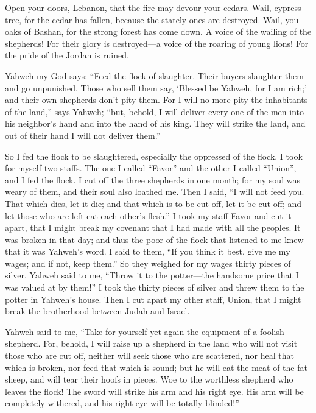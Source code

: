  Open your doors, Lebanon, that the fire may devour your
cedars.  Wail, cypress tree, for the cedar has fallen,
because the stately ones are destroyed. Wail, you oaks of Bashan, for
the strong forest has come down.  A voice of the wailing
of the shepherds! For their glory is destroyed---a voice of the roaring
of young lions! For the pride of the Jordan is ruined.

 Yahweh my God says: ``Feed the flock of slaughter.
 Their buyers slaughter them and go unpunished. Those who
sell them say, `Blessed be Yahweh, for I am rich;' and their own
shepherds don't pity them.  For I will no more pity the
inhabitants of the land,'' says Yahweh; ``but, behold, I will deliver
every one of the men into his neighbor's hand and into the hand of his
king. They will strike the land, and out of their hand I will not
deliver them.''

 So I fed the flock to be slaughtered, especially the
oppressed of the flock. I took for myself two staffs. The one I called
``Favor'' and the other I called ``Union'', and I fed the flock.
 I cut off the three shepherds in one month; for my soul
was weary of them, and their soul also loathed me.  Then I
said, ``I will not feed you. That which dies, let it die; and that which
is to be cut off, let it be cut off; and let those who are left eat each
other's flesh.''  I took my staff Favor and cut it apart,
that I might break my covenant that I had made with all the peoples.
 It was broken in that day; and thus the poor of the
flock that listened to me knew that it was Yahweh's word.
 I said to them, ``If you think it best, give me my
wages; and if not, keep them.'' So they weighed for my wages thirty
pieces of silver.  Yahweh said to me, ``Throw it to the
potter---the handsome price that I was valued at by them!'' I took the
thirty pieces of silver and threw them to the potter in Yahweh's house.
 Then I cut apart my other staff, Union, that I might
break the brotherhood between Judah and Israel.

 Yahweh said to me, ``Take for yourself yet again the
equipment of a foolish shepherd.  For, behold, I will
raise up a shepherd in the land who will not visit those who are cut
off, neither will seek those who are scattered, nor heal that which is
broken, nor feed that which is sound; but he will eat the meat of the
fat sheep, and will tear their hoofs in pieces.  Woe to
the worthless shepherd who leaves the flock! The sword will strike his
arm and his right eye. His arm will be completely withered, and his
right eye will be totally blinded!''

